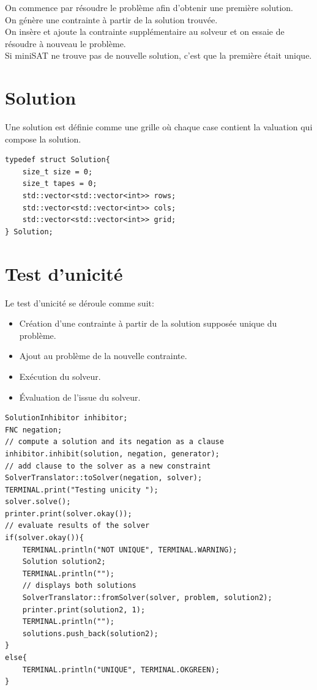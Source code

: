 \documentclass[a4paper,12pt]{report}
\begin{document}
On commence par résoudre le problème afin d'obtenir une première solution.\\
On génère une contrainte à partir de la solution trouvée.\\
On insère et ajoute la contrainte supplémentaire au solveur et on essaie de résoudre à nouveau le problème.\\ 

Si miniSAT ne trouve pas de nouvelle solution, c'est que la première était unique.\\

\section{Solution}
Une solution est définie comme une grille où chaque case contient la valuation qui compose la solution.
\lstset{style=Cpp, caption=Solution, label=C:Solution}
\begin{lstlisting}[mathescape=true]
typedef struct Solution{
	size_t size = 0;
	size_t tapes = 0;
	std::vector<std::vector<int>> rows;
	std::vector<std::vector<int>> cols;
	std::vector<std::vector<int>> grid;
} Solution;
\end{lstlisting}

\section{Test d'unicité}
Le test d'unicité se déroule comme suit:
\begin{itemize}
\item Création d'une contrainte à partir de la solution supposée unique du problème.
\item Ajout au problème de la nouvelle contrainte.
\item Exécution du solveur.
\item Évaluation de l'issue du solveur.\\ 
\end{itemize}
\lstset{style=Cpp, caption=Test d'unicité, label=C:Unicity}
\begin{lstlisting}[mathescape=true]
SolutionInhibitor inhibitor;
FNC negation;
// compute a solution and its negation as a clause
inhibitor.inhibit(solution, negation, generator);
// add clause to the solver as a new constraint
SolverTranslator::toSolver(negation, solver);
TERMINAL.print("Testing unicity ");
solver.solve();
printer.print(solver.okay());
// evaluate results of the solver
if(solver.okay()){
	TERMINAL.println("NOT UNIQUE", TERMINAL.WARNING);
	Solution solution2;
	TERMINAL.println("");
	// displays both solutions	
	SolverTranslator::fromSolver(solver, problem, solution2);
	printer.print(solution2, 1);
	TERMINAL.println("");
	solutions.push_back(solution2);
}
else{
	TERMINAL.println("UNIQUE", TERMINAL.OKGREEN);
}
\end{lstlisting}
\end{document}
